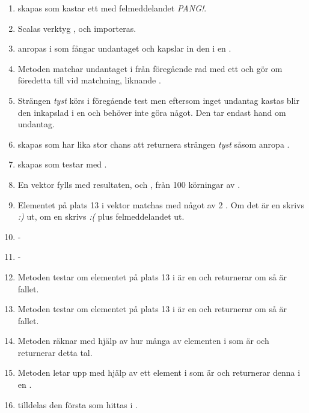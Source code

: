 \SubtaskSolved  \begin{enumerate}
\item {} skapas som kastar ett  med felmeddelandet \textit{PANG!}.
\item Scalas verktyg ,  och  importeras.
\item {} anropas i  som fångar undantaget och kapslar in den i en .
\item Metoden  matchar undantaget i  från föregående rad med ett  och gör om föredetta  till  vid matchning, liknande .
\item Strängen \textit{tyst} körs i föregående test men eftersom inget undantag kastas blir den inkapslad i en  och  behöver inte göra något. Den tar endast hand om undantag.
\item {} skapas som har lika stor chans att returnera strängen \textit{tyst} såsom anropa .
\item {} skapas som testar  med .
\item En vektor  fylls med resultaten,  och , från 100 körningar av .
\item Elementet på plats 13 i vektor  matchas med något av 2 . Om det är en  skrivs \textit{:)} ut, om en  skrivs \textit{:(} plus felmeddelandet ut.
\item -
\item -
\item Metoden  testar om elementet på plats 13 i  är en  och returnerar  om så är fallet.
\item Metoden  testar om elementet på plats 13 i  är en  och returnerar  om så är fallet.
\item Metoden  räknar med hjälp av  hur många av elementen i  som är  och returnerar detta tal.
\item Metoden  letar upp med hjälp av  ett element i  som är  och returnerar denna i en .
\item {} tilldelas den första  som hittas i .

\end{enumerate}
